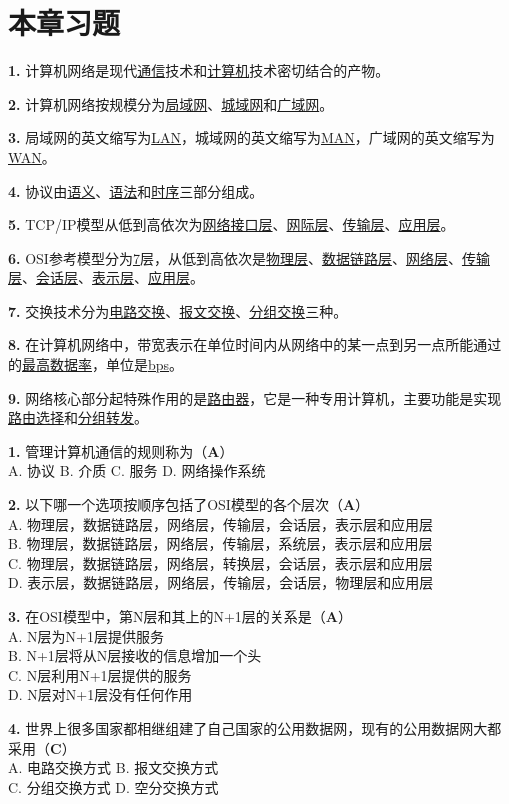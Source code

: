 \section{本章习题}

\begin{examplebox}[填空题]
\textbf{1.} 计算机网络是现代\underline{通信}技术和\underline{计算机}技术密切结合的产物。

\textbf{2.} 计算机网络按规模分为\underline{局域网}、\underline{城域网}和\underline{广域网}。

\textbf{3.} 局域网的英文缩写为\underline{LAN}，城域网的英文缩写为\underline{MAN}，广域网的英文缩写为\underline{WAN}。

\textbf{4.} 协议由\underline{语义}、\underline{语法}和\underline{时序}三部分组成。

\textbf{5.} TCP/IP模型从低到高依次为\underline{网络接口层}、\underline{网际层}、\underline{传输层}、\underline{应用层}。

\textbf{6.} OSI参考模型分为\underline{7}层，从低到高依次是\underline{物理层}、\underline{数据链路层}、\underline{网络层}、\underline{传输层}、\underline{会话层}、\underline{表示层}、\underline{应用层}。

\textbf{7.} 交换技术分为\underline{电路交换}、\underline{报文交换}、\underline{分组交换}三种。

\textbf{8.} 在计算机网络中，带宽表示在单位时间内从网络中的某一点到另一点所能通过的\underline{最高数据率}，单位是\underline{bps}。

\textbf{9.} 网络核心部分起特殊作用的是\underline{路由器}，它是一种专用计算机，主要功能是实现\underline{路由选择}和\underline{分组转发}。
\end{examplebox}

\begin{examplebox}[选择题]
\textbf{1.} 管理计算机通信的规则称为（\textbf{A}）\\
A. 协议 \quad B. 介质 \quad C. 服务 \quad D. 网络操作系统

\textbf{2.} 以下哪一个选项按顺序包括了OSI模型的各个层次（\textbf{A}）\\
A. 物理层，数据链路层，网络层，传输层，会话层，表示层和应用层\\
B. 物理层，数据链路层，网络层，传输层，系统层，表示层和应用层\\
C. 物理层，数据链路层，网络层，转换层，会话层，表示层和应用层\\
D. 表示层，数据链路层，网络层，传输层，会话层，物理层和应用层

\textbf{3.} 在OSI模型中，第N层和其上的N+1层的关系是（\textbf{A}）\\
A. N层为N+1层提供服务\\
B. N+1层将从N层接收的信息增加一个头\\
C. N层利用N+1层提供的服务\\
D. N层对N+1层没有任何作用

\textbf{4.} 世界上很多国家都相继组建了自己国家的公用数据网，现有的公用数据网大都采用（\textbf{C}）\\
A. 电路交换方式 \quad B. 报文交换方式\\
C. 分组交换方式 \quad D. 空分交换方式
\end{examplebox}

